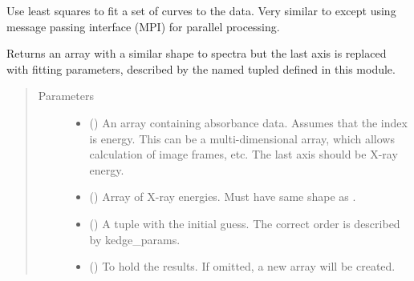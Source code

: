 \documentclass[letterpaper,10pt,english]{sphinxmanual}
\begin{document}
\begin{fulllineitems}
\label{\detokenize{xanespy:xanespy.xanes_math.fit_kedge_mpi}}
Use least squares to fit a set of curves to the data. Very similar
to  except using message passing interface (MPI) for
parallel processing.

Returns an array with a similar shape to spectra but the last axis
is replaced with fitting parameters, described by the named tupled
 defined in this module.
\begin{quote}\begin{description}
\item[{Parameters}] \leavevmode\begin{itemize}
\item {} 
 () \textendash{} An array containing absorbance data. Assumes that the index is
energy. This can be a multi-dimensional array, which allows
calculation of image frames, etc. The last axis should be X-ray
energy.

\item {} 
 () \textendash{} Array of X-ray energies. Must have same shape as .

\item {} 
 () \textendash{} A tuple with the initial guess. The correct order is described
by kedge\_params.

\item {} 
 () \textendash{} To hold the results. If omitted, a new array will be created.

\end{itemize}

\end{description}\end{quote}

\end{fulllineitems}

\end{document}

